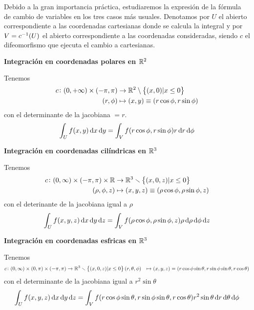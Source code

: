 \begin{obs}
    Debido a la gran importancia práctica, estudiaremos la expresión de la fórmula de cambio de variables en los tres casos más usuales.
    Denotamos por $U$ el abierto correspondiente a las coordenadas cartesianas donde se calcula la integral y por $V = c^{-1}(U)$ el
    abierto correspondiente a las coordenadas consideradas, siendo $c$ el difeomorfismo que ejecuta el cambio a cartesianas.

    \textbf{Integración en coordenadas polares en $\mathbb{R}^2$}
    
    Tenemos
    \[
        \begin{aligned}
            c \colon (0, +\infty) \times (-\pi, \pi) &\to \mathbb{R}^2 \setminus \left\{(x, 0) \vert x \leq 0\right\} \\
            (r, \phi) &\mapsto (x, y) \equiv (r \cos\phi, r \sin\phi)
        \end{aligned}
    \]
    con el determinante de la jacobiana $= r$.
    \[
        \int_U f(x,y) \dif x \dif y = \int_V f(r\cos\phi, r \sin\phi) r \dif r \dif \phi
    \]

    \textbf{Integración en coordenadas cilíndricas en $\mathbb{R}^3$}

    Tenemos
    \[
        \begin{aligned}
            c \colon (0, \infty) \times (-\pi, \pi) \times \mathbb{R} & \to \mathbb{R}^3 \smallsetminus \left\{(x, 0, z) \vert x \leq 0\right\}\\
            (\rho, \phi, z) &\mapsto (x, y, z) \equiv (\rho \cos \phi, \rho \sin \phi, z)
        \end{aligned}
    \]
    con el deterinante de la jacobiana igual a $\rho$
    \[
        \int_U f(x, y, z) \dif x \dif y \dif z = \int_V f( \rho \cos \phi, \rho \sin \phi, z) \rho \dif \rho \dif \phi \dif z
    \]

    \textbf{Integración en coordenadas esfricas en $\mathbb{R}^3$}

    Tenemos
    \[
        \begin{aligned}
            c \colon (0, \infty) \times (0, \pi) \times (-\pi, \pi) &\to \mathbb{R}^3 \smallsetminus \left\{(x, 0, z) \vert x \leq 0\right\}
            (r, \theta, \phi) &\mapsto (x, y, z) = (r\cos\phi\sin\theta, r\sin\phi\sin\theta, r\cos\theta)
        \end{aligned}
    \]
    con el determinante de la jacobiana igual a $r^2 \sin \theta$
    \[
        \int_U f(x, y, z) \dif x \dif y \dif z = \int_V f(r\cos\phi\sin\theta, r\sin\phi\sin\theta, r \cos \theta) r^2 \sin\theta
        \dif r \dif \theta \dif \phi
    \]
\end{obs}

